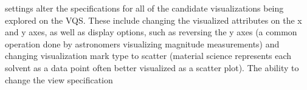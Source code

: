  settings alter the specifications for all of the candidate visualizations being explored on the VQS. These include changing 
the visualized attributes on the x and y axes, as well as display options, 
such as reversing the y axes (a common operation done by astronomers visualizing magnitude measurements) and changing visualization mark type to scatter (material science represents each solvent as a data point often better visualized as a scatter plot). The ability to change the view specification 
